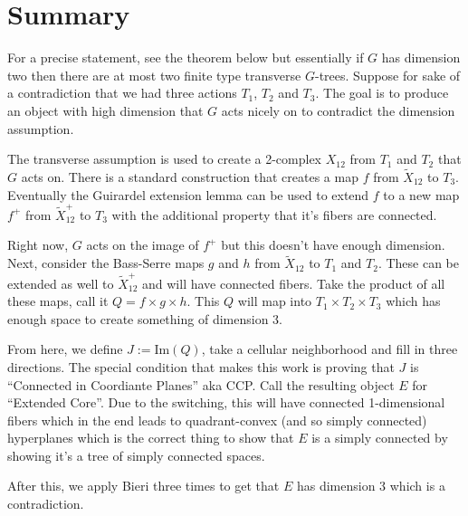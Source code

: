 \documentclass{article}
\theoremstyle{mystyle}
\theoremstyle{remark}
\begin{document}
\tableofcontents


\section{Summary}

For a precise statement, see the theorem below but essentially if $G$ has dimension two then there are at most two finite type transverse $G$-trees. Suppose for sake of a contradiction that we had three actions $T_1$, $T_2$ and $T_3$. The goal is to produce an object with high dimension that $G$ acts nicely on to contradict the dimension assumption. 

The transverse assumption is used to create a 2-complex $X_{12}$ from $T_1$ and $T_2$ that $G$ acts on. There is a standard construction that creates a map $f$ from $\widetilde X_{12}$ to $T_3$. Eventually the Guirardel extension lemma can be used to extend $f$ to a new map $ f^+$ from $\widetilde X_{12}^+$ to $T_3$ with the additional property that it's fibers are connected.

Right now, $G$ acts on the image of $f^+$ but this doesn't have enough dimension. Next, consider the Bass-Serre maps $g$ and $h$ from $\widetilde X_{12}$ to $T_1$ and $T_2$. These can be extended as well to $\widetilde X_{12}^+$ and will have connected fibers. Take the product of all these maps, call it $Q = f\times g\times h$. This $Q$ will map into $T_1 \times T_2 \times T_3$ which has enough space to create something of dimension 3.

From here, we define $J:=\text{Im}(Q)$, take a cellular neighborhood and fill in three directions. The special condition that makes this work is proving that $J$ is ``Connected in Coordiante Planes'' aka CCP. Call the resulting object $E$ for ``Extended Core''. Due to the switching, this will have connected 1-dimensional fibers which in the end leads to quadrant-convex (and so simply connected) hyperplanes which is the correct thing to show that $E$ is a simply connected by showing it's a tree of simply connected spaces.

After this, we apply Bieri three times to get that $E$ has dimension 3 which is a contradiction.
\end{document}

